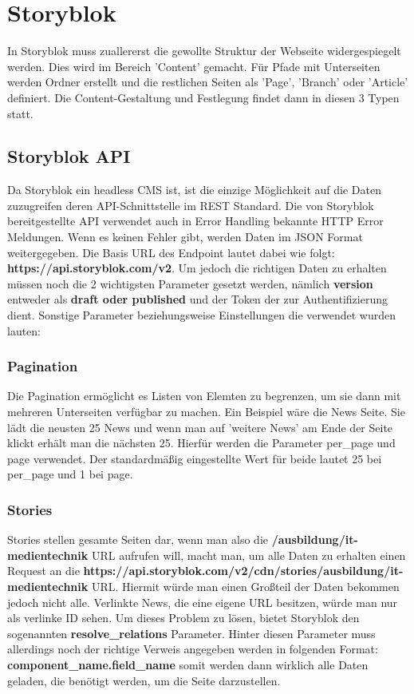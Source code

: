 

\section{Storyblok}

In Storyblok muss zuallererst die gewollte Struktur der Webseite widergespiegelt werden. Dies wird im Bereich 'Content' gemacht. 
Für Pfade mit Unterseiten werden Ordner erstellt und die restlichen Seiten  als 'Page', 'Branch' oder 'Article' definiert.
Die Content-Gestaltung und Festlegung findet dann in diesen 3 Typen statt. 


\subsection{Storyblok API}
Da Storyblok ein headless CMS ist, ist die einzige Möglichkeit auf die Daten zuzugreifen deren API-Schnittstelle im REST Standard. 
Die von Storyblok bereitgestellte API verwendet auch in Error Handling bekannte HTTP Error Meldungen. Wenn es keinen Fehler gibt, werden Daten im JSON Format weitergegeben. 
Die Basis URL des Endpoint lautet dabei wie folgt: \textbf{https://api.storyblok.com/v2}. Um jedoch die richtigen Daten zu erhalten müssen noch die 2 wichtigsten Parameter gesetzt werden, nämlich \textbf{version} entweder als \textbf{draft oder published} und der Token der zur Authentifizierung dient.
Sonstige Parameter beziehungsweise Einstellungen die verwendet wurden lauten:

\subsubsection*{Pagination}
Die Pagination ermöglicht es Listen von Elemten zu begrenzen, um sie dann mit mehreren Unterseiten verfügbar zu machen. Ein Beispiel wäre die News Seite. Sie lädt die neusten 25 News und wenn man auf 'weitere News' am Ende der Seite klickt erhält man die nächsten 25.
Hierfür werden die Parameter per\_page und page verwendet. Der standardmäßig eingestellte Wert für beide lautet 25 bei per\_page und 1 bei page.

\subsubsection*{Stories}
Stories stellen gesamte Seiten dar, wenn man also die \textbf{/ausbildung/it-medientechnik} URL aufrufen will, macht man, um alle Daten zu erhalten einen Request an die \textbf{https://api.storyblok.com/v2/cdn/stories/ausbildung/it-medientechnik} URL. 
Hiermit würde man einen Großteil der Daten bekommen jedoch nicht alle. Verlinkte News, die eine eigene URL besitzen, würde man nur als verlinke ID sehen. Um dieses Problem zu lösen, bietet Storyblok den sogenannten  \textbf{resolve\_relations} Parameter. Hinter diesen Parameter muss allerdings noch der richtige Verweis angegeben werden in folgenden Format: \textbf{component\_name.field\_name} somit werden dann wirklich alle Daten geladen, die benötigt werden, um die Seite darzustellen.

